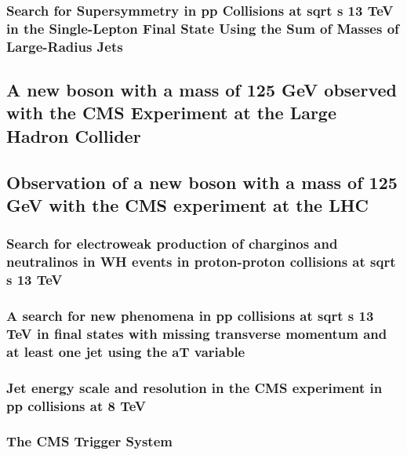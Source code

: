 \documentclass[a4paper, 11pt, twoside, openright]{report}
\begin{document}
\subsubsection{Search for Supersymmetry in pp Collisions at sqrt s 13 TeV in the Single-Lepton Final State Using the Sum of Masses of Large-Radius Jets}

\subsection{A new boson with a mass of 125 GeV observed with the CMS Experiment at the Large Hadron Collider}

\subsection{Observation of a new boson with a mass of 125 GeV with the CMS experiment at the LHC }

\subsubsection{Search for electroweak production of charginos and neutralinos in WH events in proton-proton collisions at sqrt s 13 TeV}

\subsubsection{A search for new phenomena in pp collisions at sqrt s 13 TeV in final states with missing transverse momentum and at least one jet using the aT variable}

\subsubsection{Jet energy scale and resolution in the CMS experiment in pp collisions at 8 TeV}

\subsubsection{The CMS Trigger System}

\end{document}

